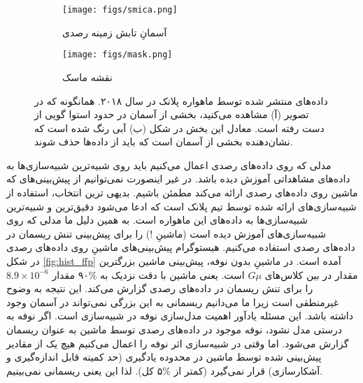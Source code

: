  \begin{figure}
 	\centering
 	\begin{subfigure}{0.5\textwidth}
 		\centering
 		\texttt{[image: figs/smica.png]}
 		\caption{آسمانِ تابش زمینه رصدی}
 	\end{subfigure}%
 	\begin{subfigure}{0.5\textwidth}
 		\centering
 		\texttt{[image: figs/mask.png]}
 		\caption{ نقشه ماسک }
 	\end{subfigure}
 	
 	\caption{ داده‌های منتشر شده توسط ماهواره پلانک در سال ۲۰۱۸. همانگونه که در تصویر (آ) مشاهده می‌کنید، بخشی از آسمان در حدود استوا گویی از دست رفته است. معادل این بخش در شکل (ب) آبی رنگ شده است که نشان‌دهنده بخشی از آسمان است که باید از داده‌ها حذف شوند.} 
 	\label{fig:pr13}
 \end{figure}
مدلی که روی داده‌های رصدی اعمال می‌کنیم باید روی شبیه‌ترین شبیه‌سازی‌ها به داده‌های مشاهداتی آموزش دیده باشد. در غیر اینصورت نمی‌توانیم از پیش‌بینی‌های که ماشین روی داده‌های رصدی ارائه می‌کند مطمئن باشیم. بدیهی ترین انتخاب، استفاده از شبیه‌سازی‌های ارائه شده توسط تیم پلانک است که ادعا می‌شود دقیق‌ترین و شبیه‌ترین شبیه‌سازی‌ها به داده‌های این ماهواره است. به همین دلیل ما مدلی که روی شبیه‌سازی‌های  آموزش دیده است (ماشینِ   !) را برای پیش‌بینی تنش ریسمان در داده‌های رصدی استفاده می‌کنیم. هیستوگرام پیش‌بینی‌های ماشینِ   روی داده‌های رصدی در شکل
\ref{fig:hist_ffp}
آمده است. در ماشینِ   بدون نوفه، پیش‌بینی ماشین بزرگترین مقدار در بین کلاس‌های $G\mu$ است. یعنی ماشین با دقت نزدیک به $\%$۹۰ مقدار
 $8.9\times10^{-6}$
 را برای تنش ریسمان در داده‌های رصدی گزارش می‌کند. این نتیجه به وضوح غیرمنطقی است زیرا ما می‌دانیم ریسمانی به این بزرگی نمی‌تواند در آسمان وجود داشته باشد. این مسئله یادآور اهمیت مدل‌سازی نوفه در شبیه‌سازی است. اگر نوفه به درستی مدل نشود، نوفه‌ موجود در داده‌های رصدی توسط ماشین به عنوان ریسمان گزارش می‌شود.  
 اما وقتی در شبیه‌سازی اثر نوفه را اعمال می‌کنیم هیچ یک از مقادیر پیش‌بینی‌ شده توسط ماشین در محدوده یادگیری (حد کمینه قابل اندازه‌گیری و آشکارسازی) قرار نمی‌گیرد (کمتر از $\%$۵ کل). لذا این یعنی ریسمانی نمی‌بینیم. 

